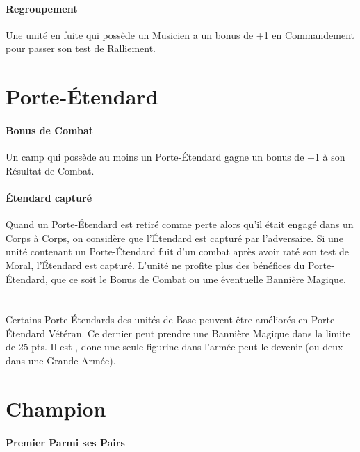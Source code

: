 \paragraph{Regroupement}

Une unité en fuite qui possède un Musicien a un bonus de +1 en Commandement pour passer son test de Ralliement.

\newpage
\section{Porte-Étendard}

\paragraph{Bonus de Combat}

Un camp qui possède au moins un Porte-Étendard gagne un bonus de +1 à son Résultat de Combat.

\paragraph{Étendard capturé}

Quand un Porte-Étendard est retiré comme perte alors qu'il était engagé dans un Corps à Corps, on considère que l'Étendard est capturé par l'adversaire. Si une unité contenant un Porte-Étendard fuit d'un combat après avoir raté son test de Moral, l'Étendard est capturé.  L'unité ne profite plus des bénéfices du Porte-Étendard, que ce soit le Bonus de Combat ou une éventuelle Bannière Magique.

\section[Porte-Étendard Vétéran]{}

Certains Porte-Étendards des unités de Base peuvent être améliorés en Porte-Étendard Vétéran. Ce dernier peut prendre une Bannière Magique dans la limite de 25 pts. Il est \oneofakind{}, donc une seule figurine dans l'armée peut le devenir (ou deux dans une Grande Armée).

\section{Champion}

\paragraph{Premier Parmi ses Pairs}

